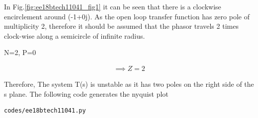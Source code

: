 In Fig.\ref{fig:ee18btech11041_fig1} it can be seen that there is a clockwise encirclement around (-1+0j).
As the open loop transfer function has zero pole of multiplicity 2, therefore it should be assumed that the phasor travels 2 times clock-wise along a semicircle of infinite radius. 

\begin{center}
N=2, P=0    
\end{center}

\begin{align}
    \implies Z = 2
\end{align}

Therefore, The system T(s) is unstable as it has two poles on the right side of the s plane. 
The following code generates the nyquist plot
\begin{lstlisting}
codes/ee18btech11041.py
\end{lstlisting}


